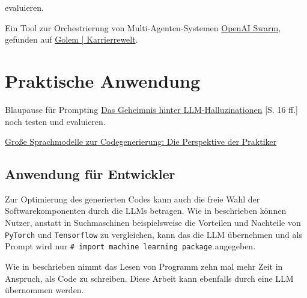 evaluieren.


\begin{tcolorbox}[
	enhanced,
	breakable,
	colback=red!5!white,
	colframe=red!75!black!50,
	title= Mein roter Faden: noch was zum Testen
	]
	Ein Tool zur Orchestrierung von Multi-Agenten-Systemen \href{https://community.openai.com/t/introducing-swarm-js-node-js-implementation-of-openai-swarm/977510}{OpenAI Swarm}, gefunden auf \href{https://karrierewelt.golem.de/blogs/karriere-ratgeber/bot-belegschaft-mit-entlastungspotenzial-ki-agenten-fur-den-arbeitsalltag-in-der-testphase-1}{Golem | Karrierrewelt}.
\end{tcolorbox}

\section{Praktische Anwendung}
Blaupause für Prompting \href{https://piamedia.com/wp-content/uploads/2024/09/PIAM_Whitepaper_LLM-Halluzinationen_DE.pdf}{Das Geheimnis hinter LLM-Halluzinationen} [S. 16 ff.] noch testen und evaluieren.

\href{https://arxiv.org/html/2501.16998v1}{Große Sprachmodelle zur Codegenerierung: Die Perspektive der Praktiker}

\subsection{Anwendung für Entwickler}
Zur Optimierung des generierten Codes kann auch die freie Wahl der Softwarekomponenten durch die LLMs betragen. Wie in \cite{chen-2021} beschrieben können Nutzer, anstatt in Suchmaschinen beispielsweise die Vorteilen und Nachteile von \texttt{PyTorch} und \texttt{Tensorflow} zu vergleichen, kann das die LLM übernehmen und als Prompt wird nur \texttt{\# import machine learning package} angegeben.\vspace{0.2cm}

Wie in \cite{le-2024} beschrieben nimmt das Lesen von Programm zehn mal mehr Zeit in Anspruch, als Code zu schreiben. Diese Arbeit kann ebenfalls durch eine LLM übernommen werden.